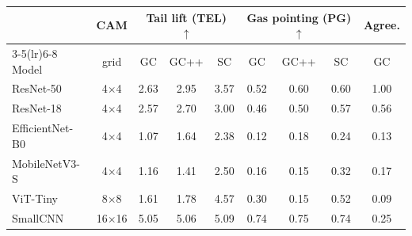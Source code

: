 \begin{tabular}{lcccccccc}
\toprule
 & CAM & \multicolumn{3}{c}{Tail lift (TEL) $\uparrow$} & \multicolumn{3}{c}{Gas pointing (PG) $\uparrow$} & Agree. \\
\cmidrule(lr){3-5}\cmidrule(lr){6-8}
Model & grid & GC & GC++ & SC & GC & GC++ & SC & GC \\
\midrule
ResNet-50 & 4$\times$4 & 2.63 & 2.95 & 3.57 & 0.52 & 0.60 & 0.60 & 1.00 \\
ResNet-18 & 4$\times$4 & 2.57 & 2.70 & 3.00 & 0.46 & 0.50 & 0.57 & 0.56 \\
EfficientNet-B0 & 4$\times$4 & 1.07 & 1.64 & 2.38 & 0.12 & 0.18 & 0.24 & 0.13 \\
MobileNetV3-S & 4$\times$4 & 1.16 & 1.41 & 2.50 & 0.16 & 0.15 & 0.32 & 0.17 \\
ViT-Tiny & 8$\times$8 & 1.61 & 1.78 & 4.57 & 0.30 & 0.15 & 0.52 & 0.09 \\
SmallCNN & 16$\times$16 & 5.05 & 5.06 & 5.09 & 0.74 & 0.75 & 0.74 & 0.25 \\
\bottomrule
\end{tabular}